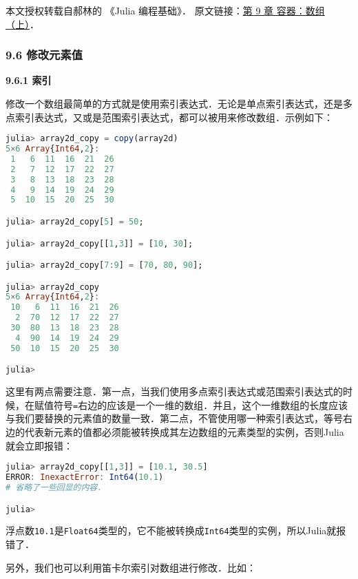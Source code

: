 
本文授权转载自郝林的 《Julia 编程基础》． 原文链接：\href{https://github.com/hyper0x/JuliaBasics/blob/master/book/ch09.md}{第 9 章 容器：数组（上）}．


\subsubsection{9.6 修改元素值}

\textbf{9.6.1 索引}

修改一个数组最简单的方式就是使用索引表达式．无论是单点索引表达式，还是多点索引表达式，又或是范围索引表达式，都可以被用来修改数组．示例如下：

\begin{lstlisting}[language=julia]
julia> array2d_copy = copy(array2d)
5×6 Array{Int64,2}:
 1   6  11  16  21  26
 2   7  12  17  22  27
 3   8  13  18  23  28
 4   9  14  19  24  29
 5  10  15  20  25  30

julia> array2d_copy[5] = 50;

julia> array2d_copy[[1,3]] = [10, 30];

julia> array2d_copy[7:9] = [70, 80, 90];

julia> array2d_copy
5×6 Array{Int64,2}:
 10   6  11  16  21  26
  2  70  12  17  22  27
 30  80  13  18  23  28
  4  90  14  19  24  29
 50  10  15  20  25  30

julia> 
\end{lstlisting}

这里有两点需要注意．第一点，当我们使用多点索引表达式或范围索引表达式的时候，在赋值符号\verb|=|右边的应该是一个一维的数组．并且，这个一维数组的长度应该与我们要替换的元素值的数量一致．第二点，不管使用哪一种索引表达式，等号右边的代表新元素的值都必须能被转换成其左边数组的元素类型的实例，否则Julia就会立即报错：

\begin{lstlisting}[language=julia]
julia> array2d_copy[[1,3]] = [10.1, 30.5]
ERROR: InexactError: Int64(10.1)
# 省略了一些回显的内容．

julia> 
\end{lstlisting}

浮点数\verb|10.1|是\verb|Float64|类型的，它不能被转换成\verb|Int64|类型的实例，所以Julia就报错了．

另外，我们也可以利用笛卡尔索引对数组进行修改．比如：

